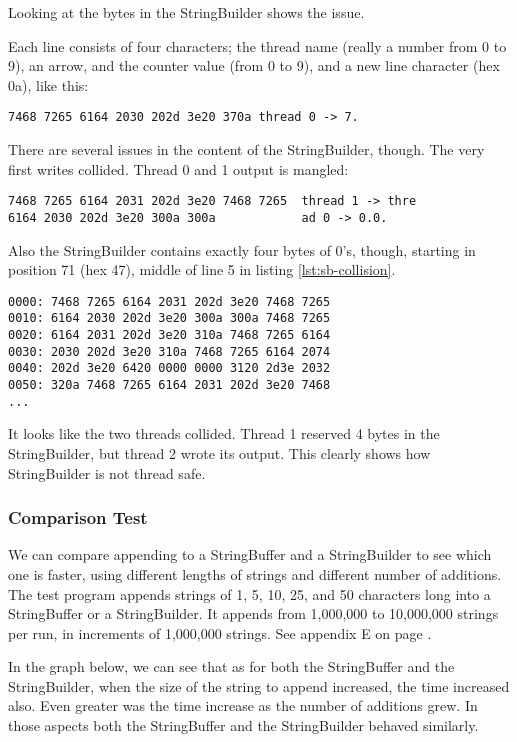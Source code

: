 Looking at the bytes in the StringBuilder shows the issue.

Each line consists of four characters; the thread name (really a number from 0 to 9), an arrow, and the counter value (from 0 to 9), and a new line character (hex 0a), like this:
\begin{lstlisting}
7468 7265 6164 2030 202d 3e20 370a thread 0 -> 7.
\end{lstlisting}

There are several issues in the content of the StringBuilder, though. The very first writes collided. Thread 0 and 1 output is mangled:
\begin{lstlisting}
7468 7265 6164 2031 202d 3e20 7468 7265  thread 1 -> thre
6164 2030 202d 3e20 300a 300a            ad 0 -> 0.0.
\end{lstlisting}

Also the StringBuilder contains exactly four bytes of 0's, though, starting in position 71 (hex 47), middle of line 5 in listing \ref{lst:sb-collision}.
\begin{lstlisting}[caption=StringBuilder Collision, label=lst:sb-collision]
0000: 7468 7265 6164 2031 202d 3e20 7468 7265
0010: 6164 2030 202d 3e20 300a 300a 7468 7265
0020: 6164 2031 202d 3e20 310a 7468 7265 6164
0030: 2030 202d 3e20 310a 7468 7265 6164 2074
0040: 202d 3e20 6420 0000 0000 3120 2d3e 2032
0050: 320a 7468 7265 6164 2031 202d 3e20 7468
...
\end{lstlisting}
\vspace{2em}

It looks like the two threads collided. Thread 1 reserved 4 bytes in the StringBuilder, but thread 2 wrote its output. This clearly shows how StringBuilder is not thread safe.

\subsubsection{Comparison Test}
We can compare appending to a StringBuffer and a StringBuilder to see which one is faster, using different lengths of strings and different number of additions. The test program appends strings of 1, 5, 10, 25, and 50 characters long into a StringBuffer or a StringBuilder. It appends from 1,000,000 to 10,000,000 strings per run, in increments of 1,000,000 strings. See appendix E on page \pageref{App:AppendixE}.

In the graph below, we can see that as for both the StringBuffer and the StringBuilder, when the size of the string to append increased, the time increased also. Even greater was the time increase as the number of additions grew. In those aspects both the StringBuffer and the StringBuilder behaved similarly.


